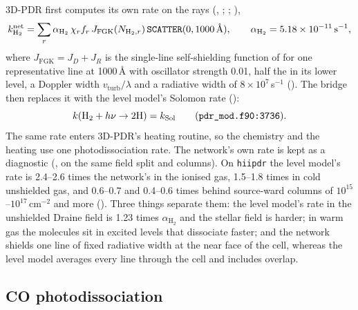3D-PDR first computes its own rate on the rays (, ;
; ),
\begin{equation}
  k^{\mathrm{net}}_{\mathrm{H_2}} = \sum_r \alpha_{\mathrm{H_2}}\,\chi_r f_r\,
     J_{\mathrm{FGK}}(N_{\mathrm{H_2},r})\,\rtn{SCATTER}(0,1000\,\text{\AA}),
  \qquad \alpha_{\mathrm{H_2}}=5.18\times10^{-11}\unit{s^{-1}},
\end{equation}
where $J_{\mathrm{FGK}}=J_D+J_R$ is the single-line self-shielding function of
\citet[their eqs.~A7--A9]{Federman1979} for one representative line at
1000\,\AA{} with oscillator strength 0.01, half the \Htwo{} in its lower level, a
Doppler width $v_{\mathrm{turb}}/\lambda$ and a radiative width of $8\times10^7$\,s$^{-1}$
(). The bridge then replaces it with
the level model's Solomon rate ():
\begin{equation}
  k(\mathrm{H_2}+h\nu\to2\mathrm H) = k_{\mathrm{Sol}}
  \qquad(\src{pdr\_mod.f90:\allowbreak{}3736}).
\end{equation}
The same rate enters 3D-PDR's heating routine, so the chemistry and the
heating use one \Htwo{} photodissociation rate. The network's own rate is kept
as a diagnostic (, on the same field split and columns). On
\texttt{hiipdr} the level model's rate is 2.4--2.6 times the network's in the
ionised gas, 1.5--1.8 times in cold unshielded gas, and 0.6--0.7 and 0.4--0.6
times behind source-ward columns of $10^{15}$--$10^{17}$\,cm$^{-2}$ and more
(). Three things separate them: the level model's rate in the
unshielded Draine field is 1.23 times $\alpha_{\mathrm{H_2}}$ and the stellar field is
harder; in warm gas the molecules sit in excited levels that dissociate
faster; and the network shields one line of fixed radiative width at the near
face of the cell, whereas the level model averages every line through the cell
and includes overlap.

\subsection{CO photodissociation}
\label{sec:co}


